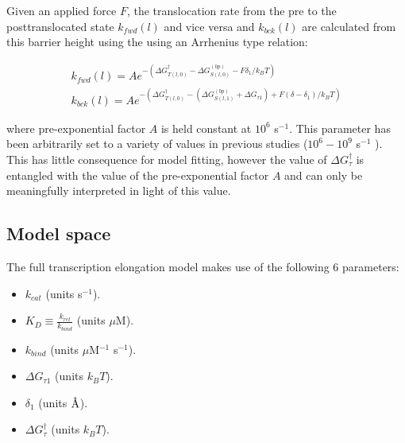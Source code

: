 \documentclass[10pt,letterpaper]{article}
\newcommand{\angstrom}{\mbox{\normalfont\AA}}
\begin{document}
Given an applied force $F$, the translocation rate from the pre to the posttranslocated state  $k_{fwd}(l)$ and vice versa and $k_{bck}(l)$ are calculated from this barrier height using the using an Arrhenius type relation: 


\begin{eqnarray}
	k_{fwd}(l) = Ae^{-(\Delta G_{T(l,0)}^{\dag} - \Delta G_{S(l,0)}^{(bp)} - F \delta_1 / k_BT )} \\
	k_{bck}(l) = Ae^{-(\Delta G_{T(l,0)}^{\dag} - (\Delta G_{S(l,1)}^{(bp)} + \Delta G_{\tau 1}) + F (\delta - \delta_1) / k_BT)}
\end{eqnarray}


where pre-exponential factor $A$ is held constant at $10^6$ s$^{-1}$. This parameter has been arbitrarily set to a variety of values in previous studies ($10^6 - 10^9$ s$^{-1}$ \cite{bai2004sequence, tadigotla2006thermodynamic, maoileidigh2011unified}). This has little consequence for model fitting, however the value of $\Delta G^\dag_\tau$ is entangled with the value of the pre-exponential factor $A$ and can only be meaningfully interpreted in light of this value. \\









\subsection*{Model space}

The full transcription elongation model makes use of the following 6 parameters:

\begin{itemize}
\item $k_{cat}$ (units s$^{-1}$).
\item $K_D \equiv \frac{k_{rel}}{k_{bind}}$ (units $\mu$M).
\item $k_{bind}$ (units $\mu$M$^{-1}$ s$^{-1}$).
\item $\Delta G_{\tau 1}$ (units $k_BT$).
\item $\delta_1$ (units $\angstrom$).
\item $\Delta G^\dag_{\tau}$ (units $k_BT$).
\end{itemize}
\end{document}
